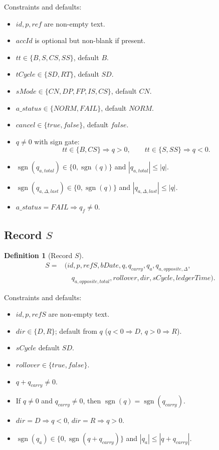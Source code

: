 \documentclass[sigconf]{acmart}
\newtheorem{definition}{Definition}
\begin{document}
Constraints and defaults:
\begin{itemize}[leftmargin=*]
  \item $id,p,ref$ are non-empty text.
  \item $accId$ is optional but non-blank if present.
  \item $tt\in\{B,S,CS,SS\}$, default $B$.
  \item $tCycle\in\{SD,RT\}$, default $SD$.
  \item $sMode\in\{CN,DP,FP,IS,CS\}$, default $CN$.
  \item $a\_status\in\{NORM,FAIL\}$, default $NORM$.
  \item $cancel\in\{true,false\}$, default $false$.
  \item $q\neq 0$ with sign gate:
  \[
  tt\in\{B,CS\}\Rightarrow q>0,\qquad tt\in\{S,SS\}\Rightarrow q<0.
  \]
  \item $\operatorname{sgn}(q_{a,total})\in\{0,\operatorname{sgn}(q)\}$ and $|q_{a,total}|\le |q|$.
  \item $\operatorname{sgn}(q_{a,\Delta,last})\in\{0,\operatorname{sgn}(q)\}$ and $|q_{a,\Delta,last}|\le |q|$.
  \item $a\_status=FAIL\Rightarrow q_f\neq 0$.
\end{itemize}

\subsection{Record $S$}
\begin{definition}[Record $S$]
\[
\begin{aligned}
S={}&(id,p,refS,bDate,q,q_{carry},q_a,q_{a,opposite,\Delta},\\
&\quad q_{a,opposite,total},rollover,dir,sCycle,ledgerTime).
\end{aligned}
\]
\end{definition}

Constraints and defaults:
\begin{itemize}[leftmargin=*]
  \item $id,p,refS$ are non-empty text.
  \item $dir\in\{D,R\}$; default from $q$ ($q<0\Rightarrow D$, $q>0\Rightarrow R$).
  \item $sCycle$ default $SD$.
  \item $rollover\in\{true,false\}$.
  \item $q+q_{carry}\neq 0$.
  \item If $q\neq 0$ and $q_{carry}\neq 0$, then $\operatorname{sgn}(q)=\operatorname{sgn}(q_{carry})$.
  \item $dir=D\Rightarrow q<0$, $dir=R\Rightarrow q>0$.
  \item $\operatorname{sgn}(q_a)\in\{0,\operatorname{sgn}(q+q_{carry})\}$ and $|q_a|\le |q+q_{carry}|$.
\end{itemize}
\end{document}
